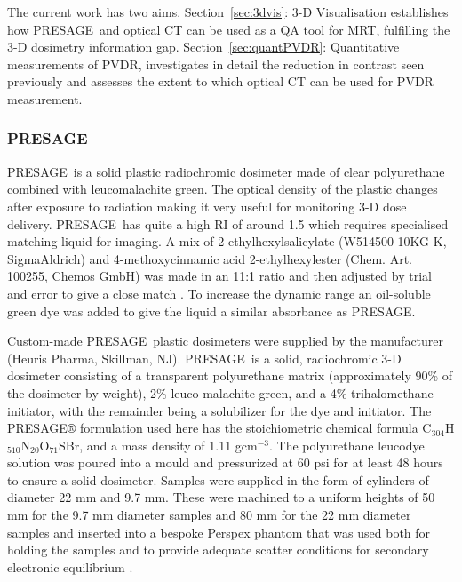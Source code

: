 	The current work  has two aims. Section~\ref{sec:3dvis}: 3-D Visualisation establishes how PRESAGE\textregistered \ and optical CT can be used as a QA tool for MRT, fulfilling the 3-D dosimetry information gap. Section~\ref{sec:quantPVDR}: Quantitative measurements of PVDR, investigates in detail the reduction in contrast seen previously and assesses the extent to which optical CT can be used for PVDR measurement. 
	
	\subsubsection{PRESAGE\textregistered}
	
		PRESAGE\textregistered ~is a solid plastic radiochromic dosimeter  made of clear polyurethane combined with leucomalachite green. \cite{adamovics2003new} The optical density of the plastic changes after exposure to radiation making it very useful for monitoring 3-D dose delivery. PRESAGE\texttrademark ~has quite a high RI of around 1.5 which requires specialised matching liquid for imaging. 
		A  mix of  2-ethylhexylsalicylate (W514500-10KG-K, SigmaAldrich)
		and 4-methoxycinnamic acid 2-ethylhexylester (Chem.   Art.   100255, Chemos GmbH) %
		was made in an 11:1 ratio and then adjusted by trial and error to give a close match \cite{AbdulRahman:2011eqa}.
		To increase the dynamic range an oil-soluble green dye was added to give the liquid a similar absorbance as PRESAGE\textregistered.
		
		Custom-made PRESAGE\textregistered \ plastic dosimeters were supplied by the manufacturer (Heuris Pharma, Skillman, NJ). PRESAGE\textregistered \ is a solid, radiochromic 3-D dosimeter consisting of a transparent polyurethane matrix (approximately 90\% of the dosimeter by weight), 2\% leuco malachite green, and a 4\% trihalomethane initiator, with the remainder being a solubilizer for the dye and initiator. The PRESAGE® formulation used here has the stoichiometric chemical formula C$_{304}$H$_{510}$N$_{20}$O$_{71}$SBr, and a mass density of 1.11 gcm$^{-3}$.  The polyurethane leucodye solution was poured into a mould and pressurized at 60 psi for at least 48 hours to ensure a solid dosimeter. Samples were supplied in the form of cylinders of diameter 22 mm and 9.7 mm. These were machined to a uniform heights of 50 mm for the 9.7 mm diameter samples and 80 mm for the 22 mm diameter samples and inserted into a bespoke Perspex phantom that was used both for holding the samples and to provide adequate scatter conditions for secondary electronic equilibrium \cite{doranestablishing2013}.
			
